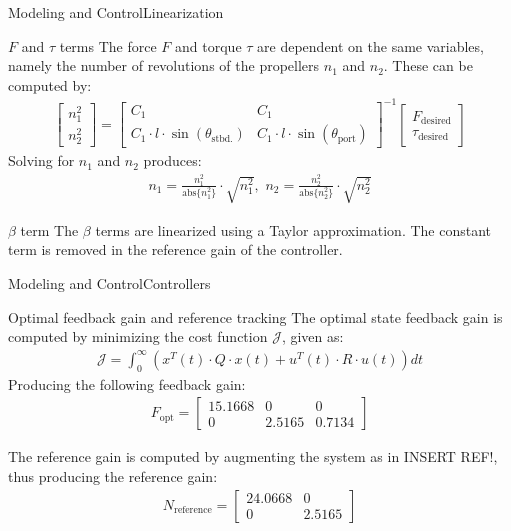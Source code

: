 \documentclass[10pt]{beamer}
\begin{document}
\begin{frame}{Modeling and Control}{Linearization}
  \begin{block}{$F$ and $\tau$ terms}
  The force $F$ and torque $\tau$ are dependent on the same variables, namely the number of revolutions of the propellers $n_1$ and $n_2$. These can be computed by:
  \begin{align}
\begin{bmatrix}
n_1^2\\
n_2^2
\end{bmatrix} = \begin{bmatrix}
C_1 & C_1\\
C_1 \cdot l \cdot \sin(\theta_\text{stbd.}) & C_1 \cdot l \cdot \sin(\theta_\text{port})
\end{bmatrix}^{-1}\begin{bmatrix}
F_\text{desired}\\
\tau_\text{desired}
\end{bmatrix}\label{eq:solver}
\end{align}
Solving for $n_1$ and $n_2$ produces:
\begin{align}
n_1 = \frac{n_1^2}{\text{abs}\{n_1^2\}} \cdot \sqrt{n_1^2},\,\, n_2 = \frac{n_2^2}{\text{abs}\{n_2^2\}} \cdot \sqrt{n_2^2}
\end{align}
  \end{block}
  \begin{block}{$\beta$ term}
  The $\beta$ terms are linearized using a Taylor approximation. The constant term is removed in the reference gain of the controller.
  \end{block}
\end{frame}

\begin{frame}{Modeling and Control}{Controllers}
\begin{block}{Optimal feedback gain and reference tracking}
The optimal state feedback gain is computed by minimizing the cost function $\mathcal{J}$, given as:
\begin{align}
\mathcal{J} = \int_0^\infty (x^T(t)\cdot Q\cdot x(t) + u^T(t) \cdot R \cdot u(t))dt
\end{align}
Producing the following feedback gain:
\begin{align}
F_\text{opt} = \begin{bmatrix}
15.1668 & 0 & 0\\
0 & 2.5165 & 0.7134
\end{bmatrix}
\end{align}
\end{block}
The reference gain is computed by augmenting the system as in INSERT REF!, thus producing the reference gain:
\begin{align}
N_\text{reference} = \begin{bmatrix}
24.0668 & 0\\
0 & 2.5165 \end{bmatrix}
\end{align}
\end{frame}
\end{document}
